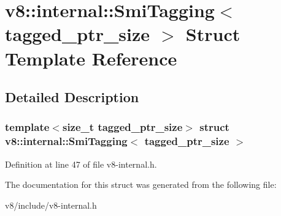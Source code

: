 \hypertarget{structv8_1_1internal_1_1SmiTagging}{}\section{v8\+:\+:internal\+:\+:Smi\+Tagging$<$ tagged\+\_\+ptr\+\_\+size $>$ Struct Template Reference}
\label{structv8_1_1internal_1_1SmiTagging}


\subsection{Detailed Description}
\subsubsection*{template$<$size\+\_\+t tagged\+\_\+ptr\+\_\+size$>$\newline
struct v8\+::internal\+::\+Smi\+Tagging$<$ tagged\+\_\+ptr\+\_\+size $>$}



Definition at line 47 of file v8-\/internal.\+h.



The documentation for this struct was generated from the following file\+:\begin{DoxyCompactItemize}
\item 
v8/include/v8-\/internal.\+h\end{DoxyCompactItemize}
